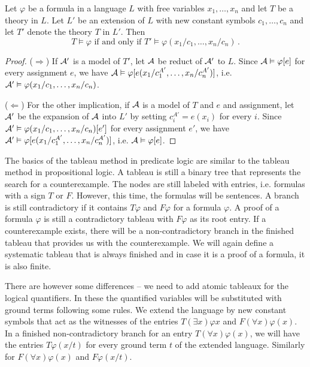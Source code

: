 \begin{theorem}
Let $\varphi$ be a formula in a language $L$ with free variables $x_1, \dots, x_n$ and let $T$ be a theory in $L$. Let $L'$ be an extension of $L$ with new constant symbols $c_1, \dots, c_n$ and let $T'$ denote the theory $T$ in $L'$. Then $$T \vDash \varphi \text{ if and only if } T'\vDash \varphi(x_1/c_1, \dots, x_n/c_n)\,.$$
\end{theorem}
\begin{proof}
($\Rightarrow$) If $\mathcal{A}'$ is a model of $T'$, let $\mathcal{A}$ be reduct of $\mathcal{A}'$ to $L$. Since $\mathcal{A} \vDash \varphi[e]$ for every assignment $e$, we have $\mathcal{A} \vDash \varphi[e(x_1/c_1^{A'}, \dots, x_n/c_n^{A'})]$, i.e. $\mathcal{A}' \vDash \varphi(x_1/c_1, \dots, x_n/c_n)$.

($\Leftarrow$) For the other implication, if $\mathcal{A}$ is a model of $T$ and $e$ and assignment, let $\mathcal{A}'$ be the expansion of $\mathcal{A}$ into $L'$ by setting $c_i^{A'} = e(x_i)$ for every $i$. Since $\mathcal{A}' \vDash \varphi(x_1/c_1, \dots, x_n/c_n)[e']$ for every assignment $e'$, we have $\mathcal{A}' \vDash \varphi[e(x_1/c_1^{A'}, \dots, x_n/c_n^{A'})]$, i.e. $\mathcal{A} \vDash \varphi[e]$.
\end{proof}

The basics of the tableau method in predicate logic are similar to the tableau method in propositional logic. A tableau is still a binary tree that represents the search for a counterexample. The nodes are still labeled with entries, i.e. formulas with a sign $T$ or $F$. However, this time, the formulas will be sentences. A branch is still contradictory if it contains $T \varphi$ and $F \varphi$ for a formula $\varphi$. A proof of a formula $\varphi$ is still a contradictory tableau with $F \varphi$ as its root entry. If a counterexample exists, there will be a non-contradictory branch in the finished tableau that provides us with the counterexample. We will again define a systematic tableau that is always finished and in case it is a proof of a formula, it is also finite. 

There are however some differences -- we need to add atomic tableaux for the logical quantifiers. In these the quantified variables will be substituted with ground terms following some rules. We extend the language by new constant symbols that act as the witnesses of the entries $T(\exists x) \varphi x$ and $F(\forall x) \varphi(x)$. In a finished non-contradictory branch for an entry $T (\forall x) \varphi(x)$, we will have the entries $T \varphi(x/t)$ for every ground term $t$ of the extended language. Similarly for $F (\forall x) \varphi(x)$ and $F \varphi(x/t)$.

